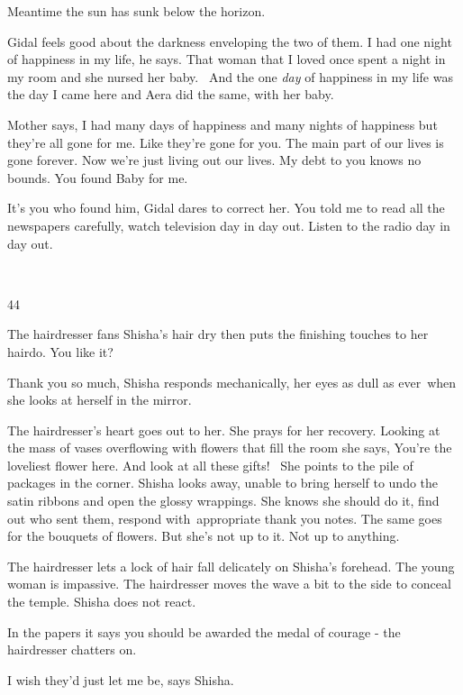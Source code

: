\documentclass[12pt]{book}
\begin{document}
Meantime the sun has sunk below the horizon.

Gidal feels good about the darkness enveloping the two of them. {\textquotedbl}I had one night of happiness in my
life,{\textquotedbl} he says. {\textquotedbl}That woman that I loved once spent a night in my room and she nursed her
baby. \ And the{ }one \textit{day }of happiness in my life was the day I came
here and Aera did the same, with her baby.{\textquotedbl}

Mother says, {\textquotedbl}I had many days of happiness and many nights of happiness but they're all gone for me. Like
they're gone for you. The main part of our lives is gone forever. Now we're just living out our lives. My debt to you
knows no bounds. You found Baby for me.{\textquotedbl}

{\textquotedbl}It's you who found him,{\textquotedbl} Gidal dares to correct her. {\textquotedbl}You told me to read all
the newspapers carefully, watch television day in day out. Listen to the radio{ }day in day
out.{\textquotedbl}

~

44

The hairdresser fans Shisha's hair dry then puts the finishing touches to her hairdo. {\textquotedbl}You like
it?{\textquotedbl}

{\textquotedbl}Thank you so much,{\textquotedbl} Shisha responds mechanically, her eyes as dull as ever~when she looks
at herself in the mirror.

The hairdresser's heart goes out to her. She prays for her recovery. Looking at the mass of vases overflowing with
flowers that fill the room she says, {\textquotedbl}You're the loveliest flower here. And look at all these
gifts!{\textquotedbl} \ She points to the pile of packages in the corner. Shisha looks away, unable to bring herself to
undo the satin ribbons and open the glossy wrappings. She knows she should do it, find out who sent them, respond
with~appropriate thank you notes. The same goes for the bouquets of flowers. But she's not up to it. Not up to
anything.

The hairdresser lets a lock of hair fall delicately on Shisha's forehead. The young woman is impassive. The hairdresser
moves the wave a bit to the side to conceal the temple. Shisha does not react.{
}\

{\textquotedbl}In the papers it says you should be awarded the medal of courage -{\textquotedbl} the hairdresser
chatters on.

{\textquotedbl}I wish they'd just let me be,{\textquotedbl} says Shisha{.}
\end{document}
